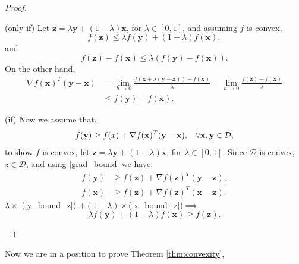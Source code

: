 \documentclass[nohyperref]{article}
\theoremstyle{plain}
\theoremstyle{definition}
\theoremstyle{remark}
\begin{document}
\begin{proof} 
\begin{trivlist}
\item{(only if) Let $\mathbf{z}=\lambda \mathbf{y} +(1-\lambda)\mathbf{x}$, for $\lambda \in [0,1]$, and assuming $f$ is convex, 
\begin{equation}
f(\mathbf{z})\le \lambda f(\mathbf{y}) +(1-\lambda)f(\mathbf{x}),
\end{equation}
and
\begin{equation}
f(\mathbf{z})-f(\mathbf{x})\le \lambda (f(\mathbf{y}) -f(\mathbf{x})).
\end{equation}
On the other hand,
\begin{align}
\nabla f(\mathbf{x})^T(\mathbf{y}-\mathbf{x})&=\lim_{h \to 0} \frac{f(\mathbf{x}+\lambda(\mathbf{y}-\mathbf{x}))-f(\mathbf{x})}{\lambda}=\lim_{h \to 0} \frac{f(\mathbf{z})-f(\mathbf{x})}{\lambda}\nonumber\\
& \le f(\mathbf{y}) -f(\mathbf{x}).
\end{align}
}
\item{(if)} Now we assume that,
\begin{equation}
f(\mathbf{y}) \ge f(x) + \nabla f(\mathbf{x})^T (\mathbf{y} - \mathbf{x}), \hspace{0.3cm} \forall \mathbf{x}, \mathbf{y} \in \mathcal{D}, \label{grad_bound}
\end{equation}
to show $f$ is convex, let $\mathbf{z}=\lambda \mathbf{y}+(1-\lambda)\mathbf{x}$, for $\lambda \in [0,1]$. Since $\mathcal{D}$ is convex, $z \in \mathcal{D}$, and using \ref{grad_bound} we have,
\begin{align}
f(\mathbf{y}) & \ge f(\mathbf{z}) + \nabla f(\mathbf{z})^T (\mathbf{y} - \mathbf{z}), \label{y_bound_z}\\
f(\mathbf{x}) & \ge f(\mathbf{z}) + \nabla f(\mathbf{z})^T (\mathbf{x} - \mathbf{z}). \label{x_bound_z}
\end{align}
$\lambda \times$ (\ref{y_bound_z}) $+ (1-\lambda)\times $(\ref{x_bound_z})$\implies$
\begin{equation}
\lambda f(\mathbf{y})+(1-\lambda)f(\mathbf{x}) \ge f(\mathbf{z}).
\end{equation}
\end{trivlist}
\end{proof}
Now we are in a position to prove Theorem \ref{thm:convexity},
\end{document}
